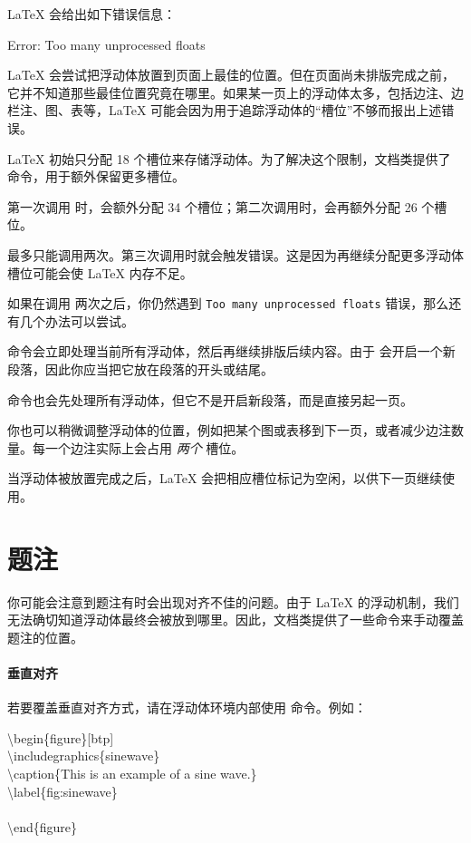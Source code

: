  \LaTeX{} 会给出如下错误信息：\label{err:too-many-floats}
\begin{docspec}
  Error: Too many unprocessed floats
\end{docspec}
\LaTeX{} 会尝试把浮动体放置到页面上最佳的位置。但在页面尚未排版完成之前，它并不知道那些最佳位置究竟在哪里。如果某一页上的浮动体太多，包括边注、边栏注、图、表等，\LaTeX{} 可能会因为用于追踪浮动体的“槽位”不够而报出上述错误。

\LaTeX{} 初始只分配 18 个槽位来存储浮动体。为了解决这个限制，\TL 文档类提供了  命令，用于额外保留更多槽位。

第一次调用  时，会额外分配 34 个槽位；第二次调用时，会再额外分配 26 个槽位。

 最多只能调用两次。第三次调用时就会触发错误。这是因为再继续分配更多浮动体槽位可能会使 \LaTeX{} 内存不足。

如果在调用  两次之后，你仍然遇到 \texttt{Too many unprocessed floats} 错误，那么还有几个办法可以尝试。

 命令会立即处理当前所有浮动体，然后再继续排版后续内容。由于  会开启一个新段落，因此你应当把它放在段落的开头或结尾。

 命令也会先处理所有浮动体，但它不是开启新段落，而是直接另起一页。

你也可以稍微调整浮动体的位置，例如把某个图或表移到下一页，或者减少边注数量。每一个边注实际上会占用 \emph{两个} 槽位。

当浮动体被放置完成之后，\LaTeX{} 会把相应槽位标记为空闲，以供下一页继续使用。

\section{题注}
你可能会注意到题注有时会出现对齐不佳的问题。由于 \LaTeX{} 的浮动机制，我们无法确切知道浮动体最终会被放到哪里。因此，\TL 文档类提供了一些命令来手动覆盖题注的位置。

\paragraph{垂直对齐} 若要覆盖垂直对齐方式，请在浮动体环境内部使用  命令。例如：

\begin{fullwidth}
\begin{docspec}
  \textbackslash begin\{figure\}[btp]\\
  \qquad \textbackslash includegraphics\{sinewave\}\\
  \qquad \textbackslash caption\{This is an example of a sine wave.\}\\
  \qquad \textbackslash label\{fig:sinewave\}\\
  \qquad {}\\
  \textbackslash end\{figure\}
\end{docspec}
\end{fullwidth}

